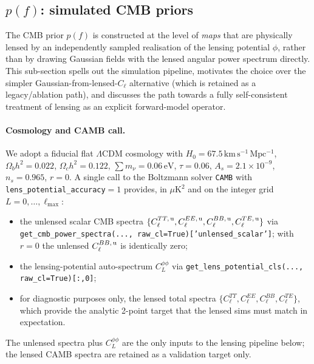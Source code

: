 \documentclass[11pt]{article}
\theoremstyle{definition}
\begin{document}
\subsection{\texorpdfstring{$p(f)$}{p(f)}: simulated CMB priors}
\label{sec:data_prior_f}

The CMB prior $p(f)$ is constructed at the level of \emph{maps} that are physically lensed by an independently sampled realisation of the lensing potential $\phi$, rather than by drawing Gaussian fields with the lensed angular power spectrum directly. This sub-section spells out the simulation pipeline, motivates the choice over the simpler Gaussian-from-lensed-$C_\ell$ alternative (which is retained as a legacy/ablation path), and discusses the path towards a fully self-consistent treatment of lensing as an explicit forward-model operator.

\paragraph{Cosmology and CAMB call.}
We adopt a fiducial flat $\Lambda$CDM cosmology with $H_0=67.5\,\mathrm{km\,s^{-1}\,Mpc^{-1}}$, $\Omega_b h^2=0.022$, $\Omega_c h^2=0.122$, $\sum m_\nu=0.06\,\mathrm{eV}$, $\tau=0.06$, $A_s=2.1\times 10^{-9}$, $n_s=0.965$, $r=0$. A single call to the Boltzmann solver \texttt{CAMB} \cite{lewis2000camb} with \texttt{lens\_potential\_accuracy}$=1$ provides, in $\mu\mathrm{K}^2$ and on the integer grid $L=0,\dots,\ell_{\max}$:
\begin{itemize}[leftmargin=1.5em,itemsep=0.1em]
  \item the unlensed scalar CMB spectra $\{C_\ell^{TT,\,\rm u},C_\ell^{EE,\,\rm u},C_\ell^{BB,\,\rm u},C_\ell^{TE,\,\rm u}\}$ via \texttt{get\_cmb\_power\_spectra(..., raw\_cl=True)['unlensed\_scalar']}; with $r=0$ the unlensed $C_\ell^{BB,\,\rm u}$ is identically zero;
  \item the lensing-potential auto-spectrum $C_L^{\phi\phi}$ via \texttt{get\_lens\_potential\_cls(..., raw\_cl=True)[:,0]};
  \item for diagnostic purposes only, the lensed total spectra $\{C_\ell^{TT},C_\ell^{EE},C_\ell^{BB},C_\ell^{TE}\}$, which provide the analytic 2-point target that the lensed sims must match in expectation.
\end{itemize}
The unlensed spectra plus $C_L^{\phi\phi}$ are the only inputs to the lensing pipeline below; the lensed CAMB spectra are retained as a validation target only.
\end{document}
